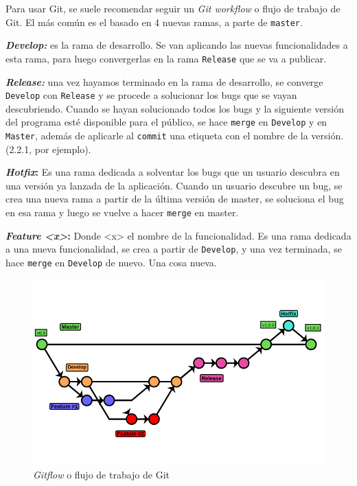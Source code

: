 \documentclass[a4paper, 11pt]{report} %
\begin{document}
Para usar Git, se suele recomendar seguir un \textit{Git workflow} o flujo de trabajo de Git. El más común es el basado en 4 nuevas ramas, a parte de \texttt{master}.
\begin{description}
\item \textbf{\textit{Develop:}} es la rama de desarrollo. Se van aplicando las nuevas funcionalidades a esta rama, para luego convergerlas en la rama \texttt{Release} que se va a publicar.
\item \textbf{\textit{Release:}} una vez hayamos terminado en la rama de desarrollo, se converge \texttt{Develop} con \texttt{Release} y se procede a solucionar los bugs que se vayan descubriendo. Cuando se hayan solucionado todos los bugs y la siguiente versión del programa esté disponible para el público, se hace \texttt{merge} en \texttt{Develop} y en \texttt{Master}, además de aplicarle al \texttt{commit} una etiqueta con el nombre de la versión. (2.2.1, por ejemplo).
\item \textbf{\textit{Hotfix}:} Es una rama dedicada a solventar los \glspl{bug} que un usuario descubra en una versión ya lanzada de la aplicación. Cuando un usuario descubre un bug, se crea una nueva rama a partir de la última versión de master, se soluciona el bug en esa rama y luego se vuelve a hacer \texttt{merge} en master.
\item \textbf{\textit{Feature <x>}:} Donde <x> el nombre de la funcionalidad. Es una rama dedicada a una nueva funcionalidad, se crea a partir de \texttt{Develop}, y una vez terminada, se hace \texttt{merge} en \texttt{Develop} de nuevo. Una cosa nueva.
\end{description}
\begin{figure}[H]
\noindent
\includegraphics[width=\textwidth]{Resources/Gitflow.png}
\caption{\textit{Gitflow} o flujo de trabajo de Git}
\end{figure}
\end{document}
